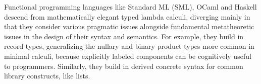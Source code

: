 Functional programming languages like Standard ML (SML), OCaml and Haskell descend from mathematically elegant typed lambda calculi, diverging mainly in that they consider various pragmatic issues alongside  fundamental metatheoretic issues in the design of their syntax and semantics.  
For example, they build in record types, generalizing the nullary and binary product types more common in minimal calculi, because explicitly labeled components can be cognitively useful to programmers. Similarly, they build in derived concrete syntax for common library constructs, like lists.%

